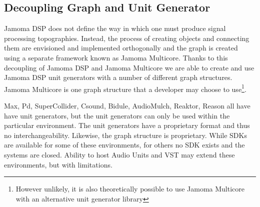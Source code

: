 \documentclass[twoside,a4paper]{article}
\begin{document}

\subsection{Decoupling Graph and Unit Generator} %

Jamoma DSP does not define the way in which one must produce signal processing topographies.  
Instead, the process of creating objects and connecting them are envisioned and implemented orthogonally and the graph is created using a separate framework known as Jamoma Multicore.  
Thanks to this decoupling of Jamoma DSP and Jamoma Multicore we are able to create and use Jamoma DSP unit generators with a number of different graph structures.  
Jamoma Multicore is one graph structure that a developer may choose to use\footnote{However unlikely, it is also theoretically possible to use Jamoma Multicore with an alternative unit generator library}.

Max, Pd, SuperCollider, Csound, Bidule, AudioMulch, Reaktor, Reason all have have unit generators, but the unit generators can only be used within the particular environment. 
The unit generators have a proprietary format and thus no interchangeability.  Likewise, the graph structure is proprietary. 
While SDKs are available for some of these environments, for others no SDK exists and the systems are closed. 
Ability to host Audio Units and VST may extend these environments, but with limitations.
\end{document}
